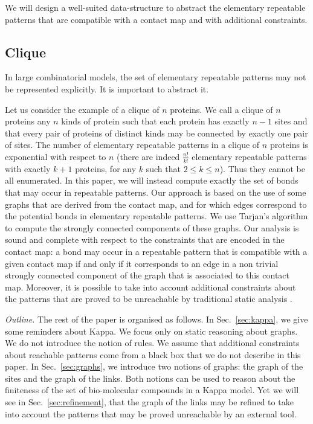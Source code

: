 \documentclass{entcs}
\begin{document}
We will design a well-suited data-structure to abstract the elementary repeatable patterns that are compatible with a contact map and with additional constraints.

\subsection{Clique}

In large combinatorial models, the set of elementary repeatable patterns
may not be represented explicitly. It is important to abstract it.

Let us consider the example of a clique of $n$ proteins.
We call a clique of $n$ proteins any $n$ kinds of protein such that each protein has exactly $n-1$ sites and that every pair of proteins of distinct kinds may be connected by exactly one pair of sites. The number of elementary repeatable patterns in a clique of $n$ proteins  is exponential with respect to $n$ (there are indeed $\frac{n!}{k!}$  elementary repeatable patterns with exactly $k+1$ proteins, for any $k$ such that $2\leq k \leq n$).
Thus they cannot be all enumerated. In this paper, we will instead compute exactly the set of bonds that may occur in repeatable patterns.
Our approach is based on the use of some graphs that are derived from the contact map, and for which edges correspond to the potential bonds in elementary repeatable patterns. We use Tarjan's algorithm \cite{tarjan} to compute the strongly connected components of these graphs. Our analysis is sound and complete with respect to the constraints that are encoded in the contact map: a bond may occur in a repeatable pattern that is compatible with a given  contact map if and only if it corresponds to an edge in a non trivial strongly connected component of the graph that is associated to this contact map. Moreover, it is possible to take into account additional constraints about the patterns that are proved to be unreachable by traditional static analysis \cite{SASB2016,KaSa}.

\emph{Outline.} The rest of the paper is organised as follows.
In Sec.~\ref{sec:kappa}, we give some reminders about Kappa.
We focus only on static reasoning about graphs. We do not introduce the notion of rules. We assume that
additional constraints about reachable patterns come from a black box that we do not describe in this paper. In Sec.~\ref{sec:graphs}, we introduce two notions of graphs: the graph of the sites and the graph of the links. Both notions can be used to reason about the finiteness of the set of bio-molecular compounds in a Kappa model. Yet we will see in Sec.~\ref{sec:refinement}, that the graph of the links  may be refined to take into account the patterns that may be proved unreachable by an external tool.
\end{document}
